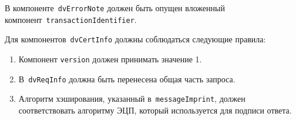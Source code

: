В компоненте~\texttt{dvErrorNote} должен быть опущен вложенный 
компонент~\texttt{transactionIdentifier}.

Для компонентов~\texttt{dvCertInfo} должны соблюдаться следующие правила:
\begin{enumerate}
\item
Компонент \texttt{version} должен принимать значение 1.
\item
В~\texttt{dvReqInfo} должна быть перенесена общая часть запроса. 
\item
Алгоритм хэширования, указанный в~\texttt{messageImprint},
должен соответствовать алгоритму ЭЦП, который используется для 
подписи ответа.
\end{enumerate}
